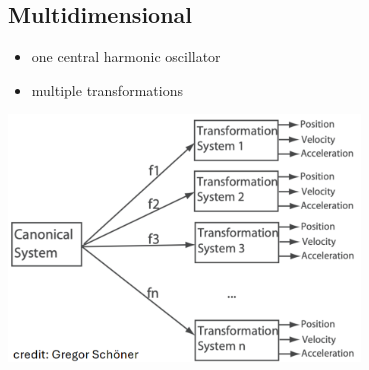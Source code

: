\documentclass[10pt]{article}
\begin{document}
\subsection*{Multidimensional}
\begin{itemize}
	\item one central harmonic oscillator
	\item multiple transformations
\end{itemize}
\begin{center} 
	\includegraphics*[width=0.7\textwidth]{L1_10.png} 
\end{center}
\end{document}
